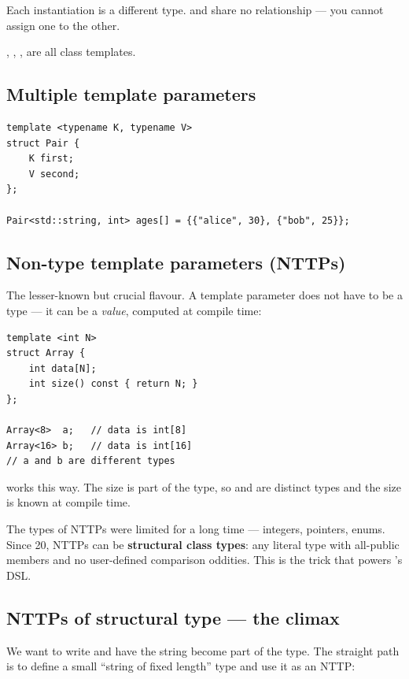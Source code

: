 Each instantiation is a different type.  and
 share no relationship --- you cannot assign one
to the other.

, ,
,  are all
class templates.

\subsection{Multiple template parameters}

\begin{lstlisting}
template <typename K, typename V>
struct Pair {
    K first;
    V second;
};

Pair<std::string, int> ages[] = {{"alice", 30}, {"bob", 25}};
\end{lstlisting}

\subsection{Non-type template parameters (NTTPs)}

The lesser-known but crucial flavour. A template parameter does not
have to be a type --- it can be a \emph{value}, computed at compile
time:

\begin{lstlisting}
template <int N>
struct Array {
    int data[N];
    int size() const { return N; }
};

Array<8>  a;   // data is int[8]
Array<16> b;   // data is int[16]
// a and b are different types
\end{lstlisting}

 works this way. The size is part of the
type, so  and  are
distinct types and the size is known at compile time.

The types of NTTPs were limited for a long time --- integers,
pointers, enums. Since \cpp{}20, NTTPs can be \textbf{structural
class types}: any literal type with all-public members and no
user-defined comparison oddities. This is the trick that powers
\maya{}'s DSL.

\subsection{NTTPs of structural type --- the climax}

We want to write  and have the string become part of
the type. The straight path is to define a small ``string of fixed
length'' type and use it as an NTTP:

